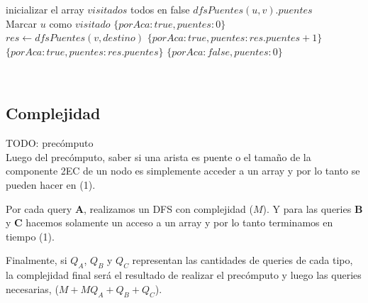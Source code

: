 \begin{algorithmic}

    \State inicializar el array $visitados$ todos en false
    \State \Return $dfsPuentes(u,v).puentes$
\EndFunction
\\

    \State Marcar $u$ como $visitado$
        \State \Return $\{porAca: true, puentes: 0\}$
    \EndIf
        \State $res \gets dfsPuentes(v, destino)$
                \State \Return $\{porAca: true, puentes: res.puentes + 1\}$
            \Else
                \State \Return $\{porAca: true, puentes: res.puentes\}$
            \EndIf
        \EndIf
    \EndFor
    \State \Return $\{porAca: false, puentes: 0\}$
\EndFunction
\\

\end{algorithmic}

\begin{algorithmic}

    \State {}
\EndFunction
\\

\end{algorithmic}

\begin{algorithmic}

    \State {}
\EndFunction

\end{algorithmic}

\subsection{Complejidad}

TODO: precómputo
\\

Luego del precómputo, saber si una arista es puente o el tamaño de la componente 2EC de un nodo es simplemente acceder a un array y por lo tanto se pueden hacer en \bigo(1).

Por cada query \textbf{A}, realizamos un DFS con complejidad \bigo($M$). Y para las queries \textbf{B} y \textbf{C} hacemos solamente un acceso a un array y por lo tanto terminamos en tiempo \bigo(1).

Finalmente, si $Q_A$, $Q_B$ y $Q_C$ representan las cantidades de queries de cada tipo, la complejidad final será el resultado de realizar el precómputo y luego las queries necesarias, \bigo($M + M Q_A + Q_B + Q_C$).
